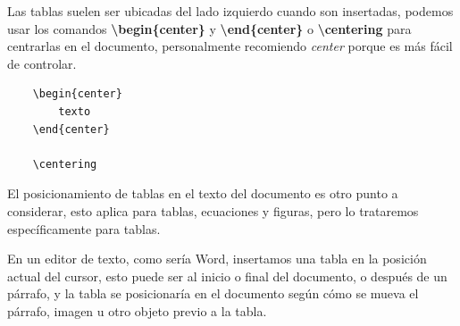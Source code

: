 Las tablas suelen ser ubicadas del lado izquierdo cuando son insertadas, podemos usar los comandos \textbf{\textbackslash{begin\{center\}}} y \textbf{\textbackslash{end\{center\}}} o \textbf{\textbackslash{centering}} para centrarlas en el documento, personalmente recomiendo \textit{center} porque es más fácil de controlar.
\begin{lstlisting}
    \begin{center}
        texto
    \end{center}
    
    \centering
\end{lstlisting}

El posicionamiento de tablas en el texto del documento es otro punto a considerar, esto aplica para tablas, ecuaciones y figuras, pero lo trataremos específicamente para tablas.

En un editor de texto, como sería Word, insertamos una tabla en la posición actual del cursor, esto puede ser al inicio o final del documento, o después de un párrafo, y la tabla se posicionaría en el documento según cómo se mueva el párrafo, imagen u otro objeto previo a la tabla.

